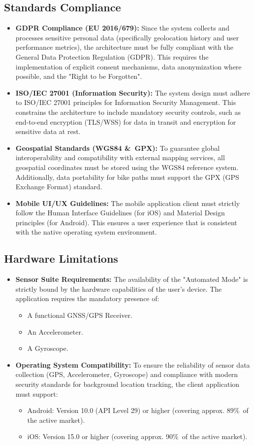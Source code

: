 \subsection{Standards Compliance}
\begin{itemize}
    \item \textbf{GDPR Compliance (EU 2016/679):} Since the system collects and processes sensitive personal data (specifically geolocation history and user performance metrics), the architecture must be fully compliant with the General Data Protection Regulation (GDPR). This requires the implementation of explicit consent mechanisms, data anonymization where possible, and the "Right to be Forgotten".
    \item \textbf{ISO/IEC 27001 (Information Security):} The system design must adhere to ISO/IEC 27001 principles for Information Security Management. This constrains the architecture to include mandatory security controls, such as end-to-end encryption (TLS/WSS) for data in transit and encryption for sensitive data at rest.
    \item \textbf{Geospatial Standards (WGS84 \&\ GPX):} To guarantee global interoperability and compatibility with external mapping services, all geospatial coordinates must be stored using the WGS84 reference system. Additionally, data portability for bike paths must support the GPX (GPS Exchange Format) standard.
    \item \textbf{Mobile UI/UX Guidelines:} The mobile application client must strictly follow the Human Interface Guidelines (for iOS) and Material Design principles (for Android). This ensures a user experience that is consistent with the native operating system environment.
\end{itemize}
\subsection{Hardware Limitations}
\begin{itemize}
    \item \textbf{Sensor Suite Requirements:} The availability of the "Automated Mode" is strictly bound by the hardware capabilities of the user's device. The application requires the mandatory presence of:
    \begin{itemize}
        \item A functional GNSS/GPS Receiver.
        \item An Accelerometer.
        \item A Gyroscope.
    \end{itemize}
    \item \textbf{Operating System Compatibility:} To ensure the reliability of sensor data collection (GPS, Accelerometer, Gyroscope) and compliance with modern security standards for background location tracking, the client application must support:
    \begin{itemize}
        \item Android: Version 10.0 (API Level 29) or higher (covering approx. 89\%\ of the active market).
        \item iOS: Version 15.0 or higher (covering approx. 90\%\ of the active market).
    \end{itemize}
\end{itemize}
